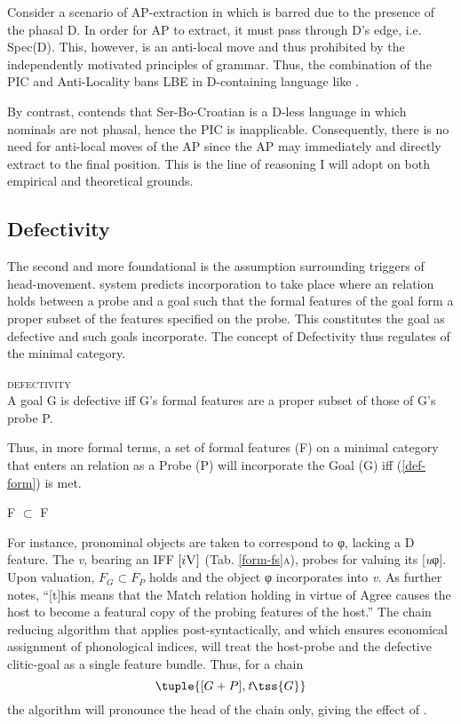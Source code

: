 \documentclass[output=paper]{langsci/langscibook}
\begin{document}
Consider a scenario of AP-extraction in  which is barred due to the
presence of the phasal D. In order for AP to extract, it must pass through D's
edge, i.e. Spec(D). This, however, is an anti-local move and thus
prohibited by the independently motivated principles of grammar. Thus, the
combination of the PIC and Anti-Locality bans \gls{LBE} in D-containing language like .

By contrast, \citet{Boskovic:2005,Boskovic2008} contends that
Ser-Bo-Croatian is a D-less language in which nominals are not phasal, hence
the PIC is inapplicable. Consequently, there is no need for anti-local moves of
the AP since the AP may immediately and directly extract to the final position.
This is the line of reasoning I will adopt on both empirical and theoretical
grounds.

\subsection{Defectivity}\label{subsec:def}

The second and more foundational is the assumption surrounding triggers of
head-movement.  system predicts
incorporation to take place where an  relation holds between a probe
and a goal such that the formal features of the goal form a proper subset of
the features specified on the probe. This constitutes the goal as defective and
such goals incorporate.  The concept of Defectivity thus regulates
 of the minimal category.

\begin{exe}
\ex \textsc{defectivity} \citep{Roberts2010}\\
A goal G is defective iff G's formal features are a proper subset of those of G's probe P.
\end{exe}

Thus, in more formal terms, a set of formal features (F) on a minimal category
that enters an  relation as a Probe (P) will incorporate the Goal
(G) iff (\ref{def-form}) is met.

\begin{exe}
    \ex F $\subset$ F
\label{def-form}
\end{exe}

For instance,  pronominal objects  are taken to
correspond to φ, lacking a D feature. The \emph{v},
bearing an \gls{IFF} $[i\textsc{V}]$ (Tab. \ref{form-fs}\textsc{a}),  probes
for valuing its [\emph{u}φ]. Upon valuation, $F_G \subset F_P$ holds and the
object φ incorporates into \emph{v}. As
\citet[391]{roberts:2012uq} further notes, ``[t]his means that the Match
relation holding in virtue of Agree causes the host to become a featural copy
of the probing features of the host.'' The chain reducing algorithm that
applies post-syntactically, and which ensures economical assignment of
phonological indices, will treat the host-probe and the defective clitic-goal
as a single feature bundle. Thus, for a chain \[\tuple{[G+P],\emph{t}\tss{G}}\]
the algorithm will pronounce the head of the chain only, giving the effect of
.
\end{document}
